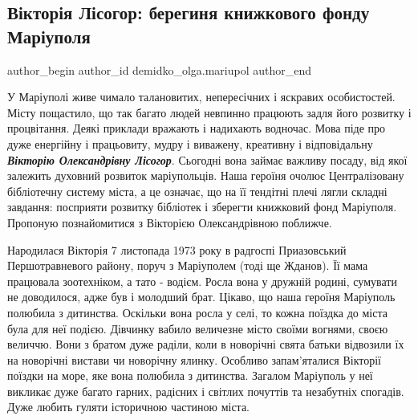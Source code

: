  
 
 
 
 
 
\subsection{Вікторія Лісогор: берегиня книжкового фонду Маріуполя}
\label{sec:19_02_2019.stz.news.ua.mrpl_city.1.viktoria_lisogor_beregynja_fondu_mariupolja}
 
\ifcmt
 author_begin
   author_id demidko_olga.mariupol
 author_end
\fi

У Маріуполі живе чимало талановитих, непересічних і яскравих особистостей.
Місту пощастило, що так багато людей невпинно працюють задля його розвитку і
процвітання. Деякі приклади вражають і надихають водночас. Мова піде про дуже
енергійну і працьовиту, мудру і виважену, креативну і відповідальну
\emph{\textbf{Вікторію Олександрівну Лісогор}}. Сьогодні вона займає важливу
посаду, від якої залежить духовний розвиток маріупольців. Наша героїня очолює
Централізовану бібліотечну систему міста, а це означає, що на її тендітні плечі
лягли складні завдання: посприяти розвитку бібліотек і зберегти книжковий фонд
Маріуполя. Пропоную познайомитися з Вікторією Олександрівною поближче.


Народилася Вікторія 7 листопада 1973 року в радгоспі Приазовський
Першотравневого району, поруч з Маріуполем (тоді ще Жданов). Її мама працювала
зоотехніком, а тато - водієм. Росла вона у дружній родині, сумувати не
доводилося, адже був і молодший брат. Цікаво, що наша героїня Маріуполь
полюбила з дитинства. Оскільки вона росла у селі, то кожна поїздка до міста
була для неї подією. Дівчинку вабило величезне місто своїми вогнями, своєю
величчю. Вони з братом дуже раділи, коли в новорічні свята батьки відвозили їх
на новорічні вистави чи новорічну ялинку. Особливо запам'яталися Вікторії
поїздки на море, яке вона полюбила з дитинства. Загалом Маріуполь у неї
викликає дуже багато гарних, радісних і світлих почуттів та незабутніх
спогадів. Дуже любить гуляти історичною частиною міста.

